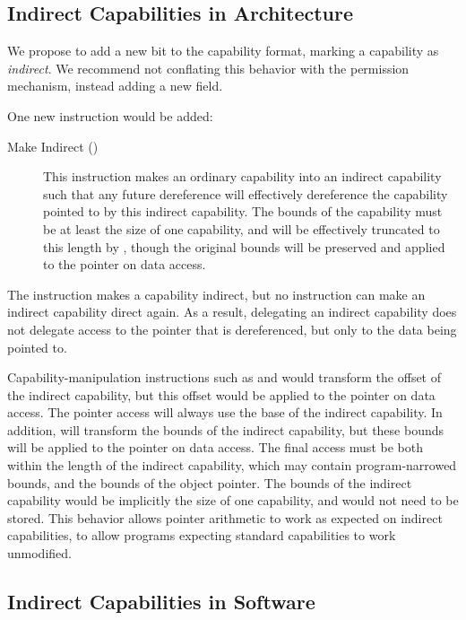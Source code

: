 \subsection{Indirect Capabilities in Architecture}

We propose to add a new bit to the capability format, marking a capability as
\textit{indirect}.
We recommend
not conflating this behavior with the permission mechanism, instead adding a
new field.

One new instruction would be added:

\begin{description}
\item[Make Indirect ()]
This instruction makes an ordinary capability into an indirect capability
such that any future dereference will effectively dereference the capability
pointed to by this indirect capability.
The bounds of the capability must be at least the size of one capability,
and will be effectively truncated to this length by ,
though the original bounds will be preserved and applied to the
pointer on data access.

\end{description}

The  instruction makes a capability indirect, but no
instruction can make an indirect capability direct again.
As a result, delegating
an indirect capability does not
delegate access to the pointer that is dereferenced, but only to the data being
pointed to.

Capability-manipulation instructions such as
 and 
would transform the offset of the indirect capability,
but this offset would be applied to the pointer on data access.
The pointer access will always use the base of the indirect capability.
In addition,  will transform the bounds of the indirect
capability, but these bounds will be applied to the pointer on data access.
The final access must be both within the length of the indirect capability,
which may contain program-narrowed bounds, and the bounds of the object pointer.
The bounds of the indirect capability would be implicitly the size of one
capability, and would not need to be stored.
This behavior allows pointer arithmetic to work as expected on indirect
capabilities, to allow programs expecting standard capabilities to work
unmodified.

\subsection{Indirect Capabilities in Software}

